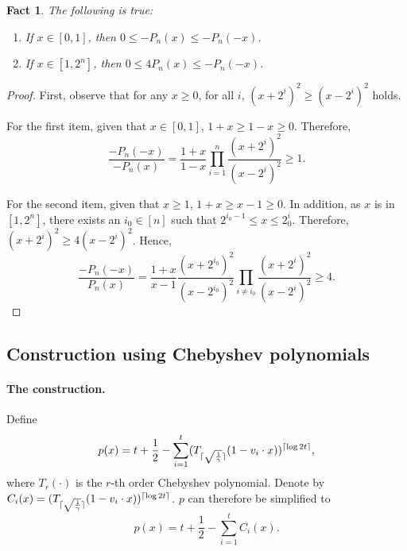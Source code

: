 \documentclass{article}
\DeclarePairedDelimiter\ceil{\lceil}{\rceil}
\newtheorem{fact}[theorem]{Fact}
\begin{document}
\begin{fact}
The following is true:
\begin{enumerate}
\item If $x \in [0,1]$, then $0 \leq -P_n(x) \leq -P_n(-x)$. \label{item:x-small}
\item If $x \in [1, 2^n]$, then $0 \leq 4P_n(x) \leq -P_n(-x)$. \label{item:x-large}
\end{enumerate}
\label{fact:pn}
\end{fact}
\begin{proof}
First, observe that for any $x \geq 0$, for all $i$, $(x+2^i)^2 \geq (x - 2^i)^2$ holds.

For the first item, given that $x \in [0,1]$, $1+x \geq 1-x \geq 0$. Therefore,
\[ \frac{-P_n(-x)}{-P_n(x)} = \frac{1+x}{1-x} \prod_{i =1}^n \frac{(x+2^i)^2}{(x - 2^i)^2}  \geq 1. \]

For the second item, given that $x \geq 1$, $1+x \geq x-1 \geq 0$. In addition, as $x$ is in $[1,2^n]$, there exists an $i_0 \in [n]$ such that $2^{i_0-1} \leq x \leq 2^i_0$. Therefore,
$(x+2^i)^2 \geq 4(x - 2^i)^2$. Hence,
\[ \frac{-P_n(-x)}{P_n(x)} = \frac{1+x}{ x-1} \frac{(x+2^{i_0})^2}{(x - 2^{i_0})^2} \prod_{i \neq i_0} \frac{(x+2^i)^2}{(x - 2^i)^2} \geq 4. \]
\end{proof}


\subsection{Construction using Chebyshev polynomials}
\paragraph{The construction.} Define
\[ p(x) = t + \frac 1 2 - \sum_{i=1}^t (T_{\ceil{\sqrt{\frac 1 \gamma}}}(1 - v_i \cdot x))^{\ceil{\log 2t}}, \]
where
$T_r(\cdot)$ is the $r$-th order Chebyshev polynomial. Denote by $C_i(x) = (T_{\ceil{\sqrt{\frac 1 \gamma}}}(1 - v_i \cdot x))^{\ceil{\log 2t}}$. $p$ can therefore be simplified to
\[ p(x) = t + \frac 1 2 - \sum_{i=1}^t C_i(x). \]
\end{document}
